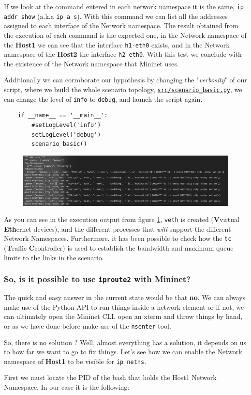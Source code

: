 \documentclass[12pt]{article}
\newcommand{\newpar} {
    \vskip 1cm
}
\begin{document}
			If we look at the command entered in each network namespace it is the same, \texttt{ip addr show} (a.k.a \texttt{ip a s}). With this command we can list all the addresses assigned to each interface of the Network namespace. The result obtained from the execution of each command is the expected one, in the Network namespace of the \textbf{Host1} we can see that the interface \texttt{h1-eth0} exists, and in the Network namespace of the \textbf{Host2} the interface \texttt{h2-eth0}. With this test we conclude with the existence of the Network namespace that Mininet uses.
			\newpar
			Additionally we can corroborate our hypothesis by changing the "\textit{verbosity}" of our script,  where we build the whole scenario topology, \newline \href{https://github.com/GAR-Project/project/blob/master/src/scenario_basic.py}{\texttt{src/scenario\_basic.py}}, we can change the level of \texttt{info} to \texttt{debug}, and launch the script again.

			\begin{verbatim}
	if __name__ == '__main__':
		#setLogLevel('info')
		setLogLevel('debug')
		scenario_basic()
			\end{verbatim}

			\begin{figure}
				\centering
				\includegraphics[width=\linewidth]{debug.png}
				\label{f:debug}
			\end{figure}

			As you can see in the execution output from figure \ref{f:debug}, \texttt{veth} is created (\textbf{V}virtual \textbf{Eth}ernet devices), and the different processes that \textit{will} support the different Network Namespaces. Furthermore, it has been possible to check how the \texttt{tc} (\textbf{T}raffic \textbf{C}controller) is used to establish the bandwidth and maximum queue limits to the links in the scenario.

		\subsubsection{So, is it possible to use \texttt{iproute2} with Mininet?}
			The quick and easy answer in the current state would be that \textbf{no}. We can always make use of the Python API to run things inside a network element or if not, we can ultimately open the Mininet CLI, open an xterm and throw things by hand, or as we have done before make use of the \texttt{nsenter} tool. 
			\newpar
			So, there is no solution ? Well, almost everything has a solution, it depends on us to how far we want to go to fix things. Let's see how we can enable the Network namespace of \textbf{Host1} to be visible for \texttt{ip netns}.
			\newpar
			First we must locate the PID of the bash that holds the Host1 Network Namespace. In our case it is the following:
\end{document}
